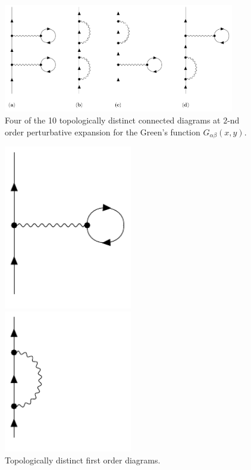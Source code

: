 \documentclass[../main/main.tex]{subfiles}
\begin{document}
\begin{figure}[h!]
\centering
\includegraphics[width=0.9\textwidth]{15_image/tutti.pdf}
\caption{\label{fig:15_1} Four of the 10 topologically distinct connected diagrams at \( 2 \)-nd order perturbative expansion for the Green's function \( G_{\alpha \beta } (x,y) \).}
\end{figure}

\begin{figure}[h!]
\begin{minipage}[c]{0.5\linewidth}
\centering
\includegraphics[width=0.5\textwidth]{../lessons/15_image/A.pdf}
\end{minipage}
\begin{minipage}[]{0.5\linewidth}
\centering
\includegraphics[width=0.5\textwidth]{../lessons/15_image/B.pdf}
\end{minipage}
\caption{\label{fig:15_2} Topologically distinct first order diagrams.}
\end{figure}
\end{document}

